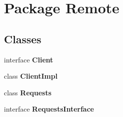 \section{Package Remote}
\label{namespace_remote}
\subsection*{Classes}
\begin{DoxyCompactItemize}
\item 
interface \textbf{ Client}
\item 
class \textbf{ Client\+Impl}
\item 
class \textbf{ Requests}
\item 
interface \textbf{ Requests\+Interface}
\end{DoxyCompactItemize}
